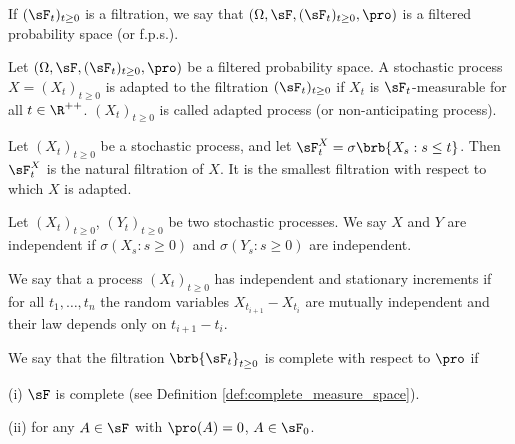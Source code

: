 \begin{definition}
If $(\sF_t)_{t\geq 0}$ is a filtration, we say that $(\Omega,\sF, (\sF_t)_{t\geq 0},\pro)$ is a filtered probability space (or f.p.s.).
\end{definition}

\begin{definition}\label{def:adapted_process_continuous}
Let $(\Omega,\sF, (\sF_t)_{t\geq 0},\pro)$ be a filtered probability space. A stochastic process $X = (X_t)_{t\geq 0}$ is adapted to the filtration $(\sF_t)_{t\geq 0}$ if $X_t$ is $\sF_t$-measurable for all $t\in \R^{++}$. $(X_t)_{t\geq 0}$ is called adapted process (or non-anticipating process).
\end{definition}


\begin{definition}
Let $(X_t)_{t\geq 0}$ be a stochastic process, and let $\sF^X_t = \sigma\brb{X_s: s \leq t}$. Then $\sF^X_t$ is the natural filtration of $X$. It is the smallest filtration with respect to which $X$ is adapted.
\end{definition}

\begin{definition}\label{def:independence_stochastic_process}
Let $(X_t)_{t\geq 0}$, $(Y_t)_{t\geq 0}$ be two stochastic processes. We say $X$ and $Y$ are independent if $\sigma(X_s: s \geq 0)$ and $\sigma(Y_s: s \geq 0)$ are independent.
\end{definition}

\begin{definition}\label{def:independent_stationary_increments_stochastic_process}
We say that a process $(X_t)_{t \geq 0}$ has independent and stationary increments if for all $t_1,\dots, t_n$ the random variables $X_{t_{i+1}} -X_{t_i}$ are mutually independent and their law depends only on $t_{i+1} - t_i$.
\end{definition}

\begin{definition}\label{def:complete_filtration}
We say that the filtration $\brb{\sF_t}_{t\geq 0}$ is complete with respect to $\pro$ if
\ben
\item [(i)] $\sF$ is complete (see Definition \ref{def:complete_measure_space}).
\item [(ii)] for any $A\in \sF$ with $\pro(A)=0$, $A\in \sF_0$.	
\een%
\end{definition}


